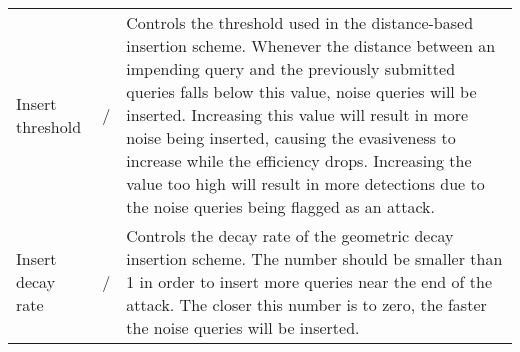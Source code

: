 \begin{longtable}{p{3cm}p{2.5cm}p{7cm}}
Insert threshold &/ &Controls the threshold used in the distance-based insertion scheme. Whenever the distance between an impending query and the previously submitted queries falls below this value, noise queries will be inserted. Increasing this value will result in more noise being inserted, causing the evasiveness to increase while the efficiency drops. Increasing the value too high will result in more detections due to the noise queries being flagged as an attack.\\
Insert decay rate &/ &Controls the decay rate of the geometric decay insertion scheme. The number should be smaller than 1 in order to insert more queries near the end of the attack. The closer this number is to zero, the faster the noise queries will be inserted.\\
\end{longtable}

